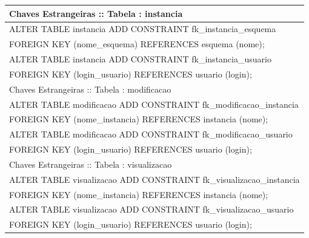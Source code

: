 \documentclass[graduacao,brazil]{ThesisPUC}
\begin{document}
\begin{table}[H]
{\begin{tabular}{|l|}
    Chaves Estrangeiras :: Tabela : instancia                                                                                                                                                                                                                                                                                                             \\ \hline
    ALTER TABLE instancia ADD CONSTRAINT fk\_instancia\_esquema \\FOREIGN KEY (nome\_esquema) REFERENCES esquema (nome);\\ALTER TABLE instancia ADD CONSTRAINT fk\_instancia\_usuario \\FOREIGN KEY (login\_usuario) REFERENCES usuario (login);                                                                                                              \\ \hline
    Chaves Estrangeiras :: Tabela : modificacao                                                                                                                                                                                                                                                                                                           \\ \hline
    ALTER TABLE modificacao ADD CONSTRAINT fk\_modificacao\_instancia \\FOREIGN KEY (nome\_instancia) REFERENCES instancia (nome);\\ALTER TABLE modificacao ADD CONSTRAINT fk\_modificacao\_usuario \\FOREIGN KEY (login\_usuario) REFERENCES usuario (login);                                                                                                \\ \hline
    Chaves Estrangeiras :: Tabela : visualizacao                                                                                                                                                                                                                                                                                                          \\ \hline
    ALTER TABLE visualizacao ADD CONSTRAINT fk\_visualizacao\_instancia \\FOREIGN KEY (nome\_instancia) REFERENCES instancia (nome);\\ALTER TABLE visualizacao ADD CONSTRAINT fk\_visualizacao\_usuario \\FOREIGN KEY (login\_usuario) REFERENCES usuario (login);                                                                                            \\ \hline

\end{tabular}}
\end{table}
\end{document}
